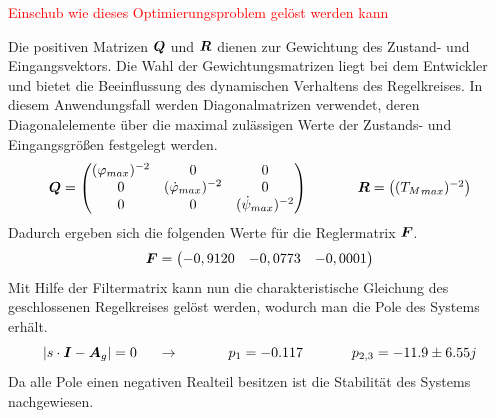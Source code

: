\textcolor{red}{Einschub wie dieses Optimierungsproblem gelöst werden kann}

Die positiven Matrizen $\boldsymbol{Q}$ und $\boldsymbol{R}$ dienen zur Gewichtung des Zustand- und Eingangsvektors. Die Wahl der Gewichtungsmatrizen liegt bei dem Entwickler und bietet die Beeinflussung des dynamischen Verhaltens des Regelkreises. In diesem Anwendungsfall werden Diagonalmatrizen verwendet, deren Diagonalelemente über die maximal zulässigen Werte der Zustands- und Eingangsgrößen festgelegt werden.
\begin{equation}
\boldsymbol{Q} = \begin{pmatrix}
(\varphi_{max})^{-2} & 0 & 0 \\
0 & (\dot{\varphi}_{max})^{-2} & 0 \\
0 & 0 & (\dot{\psi}_{max})^{-2}
\end{pmatrix}
\hspace{35pt}
\boldsymbol{R} = \begin{pmatrix}
({T_M}_{max})^{-2}
\end{pmatrix}
\end{equation}
Dadurch ergeben sich die folgenden Werte für die Reglermatrix $\boldsymbol{F}$.
\begin{equation}
\boldsymbol{F}=\begin{pmatrix}
-0,9120 & -0,0773 & -0,0001
\end{pmatrix}
\end{equation}
Mit Hilfe der Filtermatrix kann nun die charakteristische Gleichung des geschlossenen Regelkreises gelöst werden, wodurch man die Pole des Systems erhält.
\begin{equation}
|s\cdot \boldsymbol{I}-\boldsymbol{A}_g| = 0 \hspace{15pt}\rightarrow\hspace{35pt} p_1 = -0.117 \hspace{35pt} p_{2,3} = -11.9 \pm6.55j
\end{equation}
Da alle Pole einen negativen Realteil besitzen ist die Stabilität des Systems nachgewiesen.

